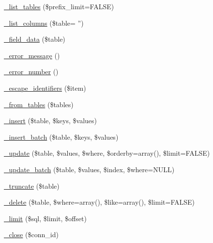 \begin{DoxyCompactItemize}
\item 
\hyperlink{class_c_i___d_b__pdo__driver_a435c0f3ce54fe7daa178baa8532ebd54}{\-\_\-list\-\_\-tables} (\$prefix\-\_\-limit=F\-A\-L\-S\-E)
\item 
\hyperlink{class_c_i___d_b__pdo__driver_a2a81bb476a5c76fe6f763b0557c1e4c2}{\-\_\-list\-\_\-columns} (\$table= '')
\item 
\hyperlink{class_c_i___d_b__pdo__driver_a95247d9671893adc3444cb184ad32ea1}{\-\_\-field\-\_\-data} (\$table)
\item 
\hyperlink{class_c_i___d_b__pdo__driver_a4ca764fe1d6ad526f770f36b5f332bbb}{\-\_\-error\-\_\-message} ()
\item 
\hyperlink{class_c_i___d_b__pdo__driver_a3e48199b3a946499b7e5fba0cdfa6b86}{\-\_\-error\-\_\-number} ()
\item 
\hyperlink{class_c_i___d_b__pdo__driver_aeabfb3952399caa92a013621a98e3042}{\-\_\-escape\-\_\-identifiers} (\$item)
\item 
\hyperlink{class_c_i___d_b__pdo__driver_a885a8b4372b5c099749cefa73767a744}{\-\_\-from\-\_\-tables} (\$tables)
\item 
\hyperlink{class_c_i___d_b__pdo__driver_a69ee76b136052e0a8f06097fb388e53e}{\-\_\-insert} (\$table, \$keys, \$values)
\item 
\hyperlink{class_c_i___d_b__pdo__driver_a1978e1358c812587a46e242630365099}{\-\_\-insert\-\_\-batch} (\$table, \$keys, \$values)
\item 
\hyperlink{class_c_i___d_b__pdo__driver_ae869ae2275175c5ffa22816a02099d96}{\-\_\-update} (\$table, \$values, \$where, \$orderby=array(), \$limit=F\-A\-L\-S\-E)
\item 
\hyperlink{class_c_i___d_b__pdo__driver_acdcbd5642090362dfe49120a222670b9}{\-\_\-update\-\_\-batch} (\$table, \$values, \$index, \$where=N\-U\-L\-L)
\item 
\hyperlink{class_c_i___d_b__pdo__driver_aa029600528fc1ce660a23ff4b4667f95}{\-\_\-truncate} (\$table)
\item 
\hyperlink{class_c_i___d_b__pdo__driver_ace3cbc04a520b7811fc956cdb9ae1c19}{\-\_\-delete} (\$table, \$where=array(), \$like=array(), \$limit=F\-A\-L\-S\-E)
\item 
\hyperlink{class_c_i___d_b__pdo__driver_aeeaa5cd68dc6ace010c0b8aae89c2d15}{\-\_\-limit} (\$sql, \$limit, \$offset)
\item 
\hyperlink{class_c_i___d_b__pdo__driver_a557bd6ddde8de1f7814e10b1120efd29}{\-\_\-close} (\$conn\-\_\-id)
\end{DoxyCompactItemize}

